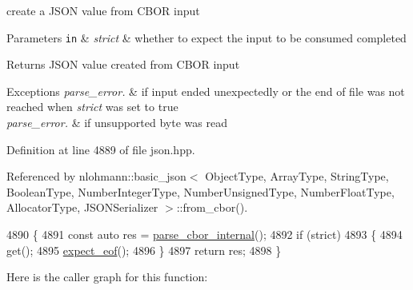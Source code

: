 create a J\+S\+ON value from C\+B\+OR input 


\begin{DoxyParams}[1]{Parameters}
\mbox{\tt in}  & {\em strict} & whether to expect the input to be consumed completed \\
\hline
\end{DoxyParams}
\begin{DoxyReturn}{Returns}
J\+S\+ON value created from C\+B\+OR input
\end{DoxyReturn}

\begin{DoxyExceptions}{Exceptions}
{\em parse\+\_\+error.} & if input ended unexpectedly or the end of file was not reached when {\itshape strict} was set to true \\
\hline
{\em parse\+\_\+error.} & if unsupported byte was read \\
\hline
\end{DoxyExceptions}


Definition at line 4889 of file json.\+hpp.



Referenced by nlohmann\+::basic\+\_\+json$<$ Object\+Type, Array\+Type, String\+Type, Boolean\+Type, Number\+Integer\+Type, Number\+Unsigned\+Type, Number\+Float\+Type, Allocator\+Type, J\+S\+O\+N\+Serializer $>$\+::from\+\_\+cbor().


\begin{DoxyCode}
4890     \{
4891         \textcolor{keyword}{const} \textcolor{keyword}{auto} res = \hyperlink{classnlohmann_1_1detail_1_1binary__reader_a0d919ee892fbbeedb27ff95c4e4010e1}{parse\_cbor\_internal}();
4892         \textcolor{keywordflow}{if} (strict)
4893         \{
4894             \textcolor{keyword}{get}();
4895             \hyperlink{classnlohmann_1_1detail_1_1binary__reader_ad0eebfcfd82778a76e1ae72dec49c25f}{expect\_eof}();
4896         \}
4897         \textcolor{keywordflow}{return} res;
4898     \}
\end{DoxyCode}
Here is the caller graph for this function\+:
\mbox{\label{classnlohmann_1_1detail_1_1binary__reader_a0d919ee892fbbeedb27ff95c4e4010e1}} 
